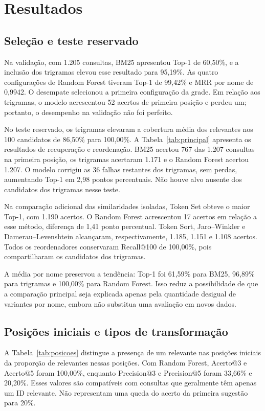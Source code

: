 \section{Resultados}

\subsection{Seleção e teste reservado}

Na validação, com 1.205 consultas, BM25 apresentou Top-1 de 60,50\%, e a inclusão dos trigramas elevou esse resultado para 95,19\%. As quatro configurações de Random Forest tiveram Top-1 de 99,42\% e MRR por nome de 0,9942. O desempate selecionou a primeira configuração da grade. Em relação aos trigramas, o modelo acrescentou 52 acertos de primeira posição e perdeu um; portanto, o desempenho na validação não foi perfeito.

No teste reservado, os trigramas elevaram a cobertura média dos relevantes nos 100 candidatos de 86,50\% para 100,00\%. A Tabela~\ref{tab:principal} apresenta os resultados de recuperação e reordenação. BM25 acertou 767 das 1.207 consultas na primeira posição, os trigramas acertaram 1.171 e o Random Forest acertou 1.207. O modelo corrigiu as 36 falhas restantes dos trigramas, sem perdas, aumentando Top-1 em 2,98 pontos percentuais. Não houve alvo ausente dos candidatos dos trigramas nesse teste.



Na comparação adicional das similaridades isoladas, Token Set obteve o maior Top-1, com 1.190 acertos. O Random Forest acrescentou 17 acertos em relação a esse método, diferença de 1,41 ponto percentual. Token Sort, Jaro--Winkler e Damerau--Levenshtein alcançaram, respectivamente, 1.185, 1.151 e 1.108 acertos. Todos os reordenadores conservaram Recall@100 de 100,00\%, pois compartilharam os candidatos dos trigramas.

A média por nome preservou a tendência: Top-1 foi 61,59\% para BM25, 96,89\% para trigramas e 100,00\% para Random Forest. Isso reduz a possibilidade de que a comparação principal seja explicada apenas pela quantidade desigual de variantes por nome, embora não substitua uma avaliação em novos dados.

\subsection{Posições iniciais e tipos de transformação}

A Tabela~\ref{tab:posicoes} distingue a presença de um relevante nas posições iniciais da proporção de relevantes nessas posições. Com Random Forest, Acerto@3 e Acerto@5 foram 100,00\%, enquanto Precision@3 e Precision@5 foram 33,66\% e 20,20\%. Esses valores são compatíveis com consultas que geralmente têm apenas um ID relevante. Não representam uma queda do acerto da primeira sugestão para 20\%.

